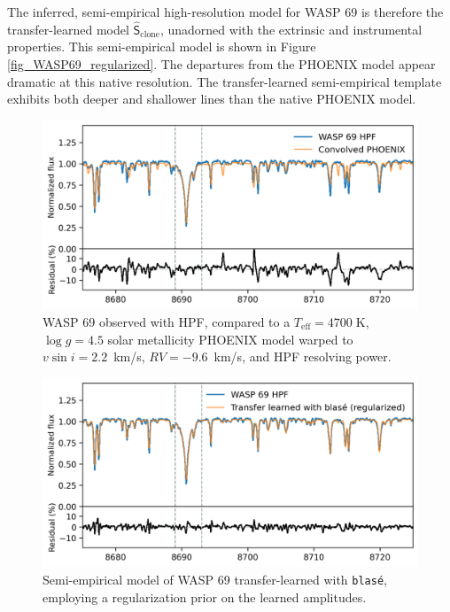 \documentclass[twocolumn]{aastex631}
\begin{document}
The inferred, semi-empirical high-resolution model for WASP 69 is therefore the transfer-learned model $\mathsf{\hat{S}}_\mathrm{clone}$, unadorned with the extrinsic and instrumental properties.  This semi-empirical model is shown in Figure \ref{fig_WASP69_regularized}.  The departures from the PHOENIX model appear dramatic at this native resolution.  The transfer-learned semi-empirical template exhibits both deeper and shallower lines than the native PHOENIX model.


\begin{figure}[hbt!]
    \centering
    \includegraphics[width=0.98\columnwidth]{figures/blase_WASP69_demo.png}
    \caption{WASP 69 observed with HPF, compared to a $T_{\mathrm{eff}}=4700\;$K,  $\log{g}=4.5$ solar metallicity PHOENIX model warped to $v\sin{i}=2.2$~km/s, $RV=-9.6$~km/s, and HPF resolving power.}
    \label{fig_WASP69_demo}
\end{figure}

\begin{figure}[hbt!]
    \centering
    \includegraphics[width=0.98\columnwidth]{figures/blase_WASP69_regularized.png}
    \caption{Semi-empirical model of WASP 69 transfer-learned with \texttt{blas\'e}, employing a regularization prior on the learned amplitudes.}
    \label{fig_WASP69_transferred}
\end{figure}
\end{document}
